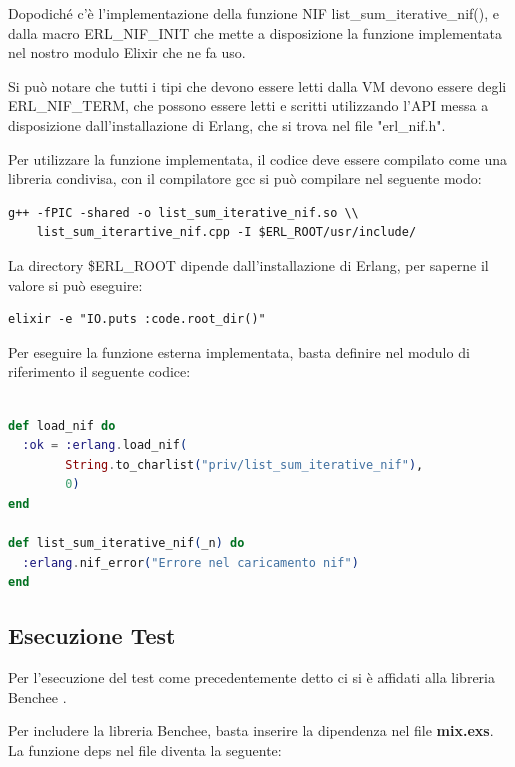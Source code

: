 Dopodiché c'è l'implementazione della funzione
NIF list\_sum\_iterative\_nif(), e dalla macro ERL\_NIF\_INIT
che mette a disposizione la funzione implementata nel nostro
modulo Elixir che ne fa uso.

Si può notare che tutti i tipi che devono essere letti
dalla VM devono essere degli ERL\_NIF\_TERM, che possono essere
letti e scritti utilizzando l'API messa a disposizione dall'installazione
di Erlang, che si trova nel file "erl\_nif.h".

Per utilizzare la funzione implementata, il codice deve essere compilato
come una libreria condivisa, con il compilatore gcc si può compilare
nel seguente modo:

\begin{lstlisting}[language=none]
g++ -fPIC -shared -o list_sum_iterative_nif.so \\
    list_sum_iterartive_nif.cpp -I $ERL_ROOT/usr/include/
\end{lstlisting}

La directory \$ERL\_ROOT dipende dall'installazione di Erlang,
per saperne il valore si può eseguire:
\begin{lstlisting}[language=none]
elixir -e "IO.puts :code.root_dir()"
\end{lstlisting}

Per eseguire la funzione esterna implementata, basta definire
nel modulo di riferimento il seguente codice:

\begin{lstlisting}[language=elixir,captionpos=b,
	caption={Funzione list\_sum\_port()},
	label={lst:listsumportelixir}]

def load_nif do
  :ok = :erlang.load_nif(
	    String.to_charlist("priv/list_sum_iterative_nif"),
		0)
end

def list_sum_iterative_nif(_n) do
  :erlang.nif_error("Errore nel caricamento nif")
end
\end{lstlisting}



\subsection{Esecuzione Test}

Per l'esecuzione del test come precedentemente detto
ci si è affidati alla libreria Benchee \cite{bencheeo54:online}.

Per includere la libreria Benchee, basta inserire la dipendenza
nel file \textbf{mix.exs}.
La funzione deps nel file diventa la seguente:

